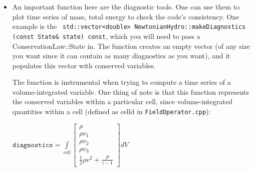 \documentclass{article}
\begin{document}
\begin{itemize}
\item An important function here are the diagnostic tools. One can use them to plot time series of mass, total energy to check the code's consistency. One example is the \texttt{ std::vector<double> NewtonianHydro::makeDiagnostics (const State\& state) const}, which you will need to pass a ConservationLaw::State in. The function creates an empty vector (of any size you want since it can contain as many diagnostics as you want), and it populates this vector with conserved variables.

The function is instrumental when trying to compute a time series of a volume-integrated variable. One thing of note is that this function represents the conserved variables within a particular cell, since volume-integrated quantities within a cell (defined as celld in \texttt{FieldOperator.cpp}):

$\texttt{diagnostics}=\int\limits_{\text{cell}} \left[\begin{smallmatrix}
	\rho \\
	\rho v_1 \\
	\rho v_2 \\
	\rho v_3 \\
	\frac{1}{2}\rho v^2 + \frac{P}{\gamma - 1}  
\end{smallmatrix} \right] dV$

 
\end{itemize}
 
\end{document}
